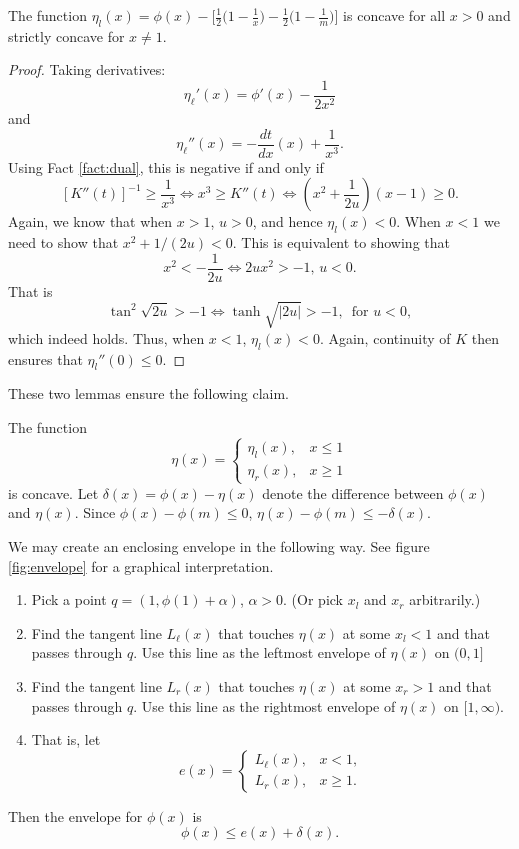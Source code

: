 \documentclass[12pt]{article}
\newcommand{\dd}[2]{\frac{d #1}{d #2}}
\begin{document}
\begin{lemma}
  The function $\eta_l(x) = \phi(x) - \Big[\frac{1}{2} \Big(1- \frac{1}{x}\Big)
  - \frac{1}{2} \Big(1- \frac{1}{m}\Big)\Big]$ is concave for all $x > 0$ and
  strictly concave for $x \neq 1$.
\end{lemma}

\begin{proof}
Taking derivatives:
\[
\eta_\ell'(x) = \phi'(x) - \frac{1}{2x^2}
\]
and
\[
\eta_\ell''(x) = - \dd{t}{x}(x) + \frac{1}{x^3}.
\]
Using Fact \ref{fact:dual}, this is negative if and only if
\[
[K''(t)]^{-1} \geq \frac{1}{x^3} \iff x^3 \geq K''(t) \iff (x^2 +
\frac{1}{2u})(x-1) \geq 0.
\]
Again, we know that when $x > 1$, $u > 0$, and hence $\eta_l(x) < 0$.  When $x <
1$ we need to show that $x^2 + 1/(2u) < 0$.  This is equivalent to showing that
\[
x^2 < -\frac{1}{2u} \iff 2u x^2 > -1, \, u < 0.
\]
That is
\[
\tan^2{\sqrt{2u}} > -1 \iff \tanh{\sqrt{|2u|}} > -1, \, \text{ for } u < 0,
\]
which indeed holds.  Thus, when $x < 1$, $\eta_l(x) < 0$.  Again, continuity of
$K$ then ensures that $\eta_l''(0) \leq 0$.
\end{proof}

These two lemmas ensure the following claim.
\begin{claim}
The function
\[
\eta(x) =
\begin{cases}
\eta_l(x), & x \leq 1 \\
\eta_r(x), & x \geq 1
\end{cases}
\]
is concave.  Let $\delta(x) = \phi(x) - \eta(x)$ denote the difference between
$\phi(x)$ and $\eta(x)$.  Since $\phi(x) - \phi(m) \leq 0$, $\eta(x) - \phi(m)
\leq - \delta(x)$.
\end{claim}

We may create an enclosing envelope in the following way.  See figure
\ref{fig:envelope} for a graphical interpretation.

\begin{enumerate}
\item Pick a point $q = (1, \phi(1)+\alpha)$, $\alpha>0$.  (Or pick $x_l$ and
  $x_r$ arbitrarily.)
\item Find the tangent line $L_\ell(x)$ that touches $\eta(x)$ at some $x_l < 1$
  and that passes through $q$.  Use this line as the leftmost envelope of
  $\eta(x)$ on $(0,1]$
\item Find the tangent line $L_r(x)$ that touches $\eta(x)$ at some $x_r > 1$
  and that passes through $q$.  Use this line as the rightmost envelope of
  $\eta(x)$ on $[1,\infty)$.
\item That is, let
\[
e(x) = 
\begin{cases}
L_\ell(x), & x < 1, \\
L_r(x), & x \geq 1.
\end{cases}
\]
\end{enumerate}
Then the envelope for $\phi(x)$ is
\[
\phi(x) \leq e(x) + \delta(x).
\]
\end{document}
